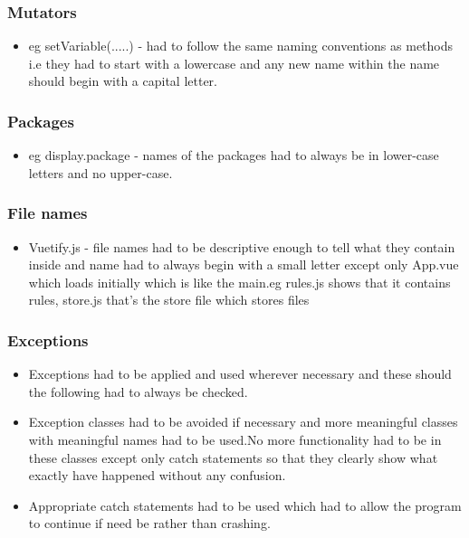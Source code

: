 \documentclass[12pt]{article}
\begin{document}
  \subsubsection{Mutators}
   \begin{itemize} 
 	 \item eg setVariable(.....) - had to  follow the same naming conventions as methods i.e they had to start with a lowercase and any new name within the name should begin with a capital letter.
 	  \end{itemize} 
 	    \subsubsection{Packages} 
   \begin{itemize}
 	 \item eg display.package -  names of the packages had to  always be in lower-case letters and no 			upper-case.
 	 \end{itemize} 
 	 
   \subsubsection{File names}
    \begin{itemize} 
  		\item Vuetify.js - file names had to be descriptive enough to tell what they contain inside and name had to always 	begin with a small letter except only App.vue which loads initially which is like the main.eg rules.js shows that it contains rules, store.js that's the store file which stores files
	\end{itemize}
	\subsubsection{Exceptions}
 	\begin{itemize} 
 		\item Exceptions had to be applied and used wherever necessary and these should the following had to always be checked.
 		\item Exception classes had to be avoided if necessary and more meaningful classes with meaningful names had to be used.No more functionality had to be in these classes except only catch 	statements so that they clearly show what exactly have happened without any confusion.
 		\item Appropriate catch statements had to be used which had to allow the program to continue if need be rather than crashing.
	\end{itemize}
	
\end{document}
